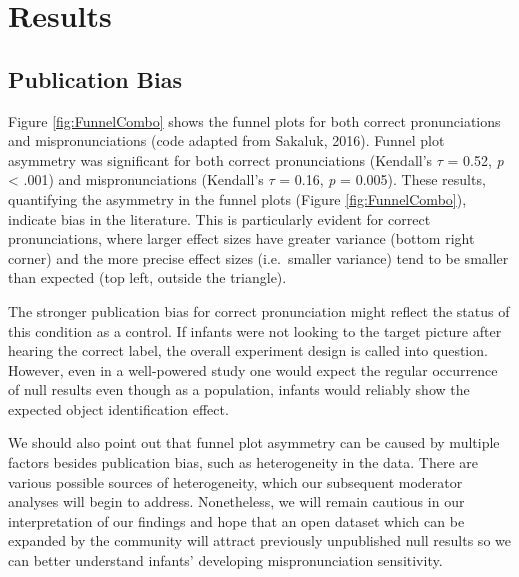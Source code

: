 \documentclass[
  man, noextraspace]{apa6}
\begin{document}
\hypertarget{results}{%
\section{Results}\label{results}}

\hypertarget{publication-bias-1}{%
\subsection{Publication Bias}\label{publication-bias-1}}

Figure \ref{fig:FunnelCombo} shows the funnel plots for both correct pronunciations and mispronunciations (code adapted from Sakaluk, 2016). Funnel plot asymmetry was significant for both correct pronunciations (Kendall's \(\tau\) = 0.52, \emph{p} \textless{} .001) and mispronunciations (Kendall's \(\tau\) = 0.16, \emph{p} = 0.005). These results, quantifying the asymmetry in the funnel plots (Figure \ref{fig:FunnelCombo}), indicate bias in the literature. This is particularly evident for correct pronunciations, where larger effect sizes have greater variance (bottom right corner) and the more precise effect sizes (i.e.~smaller variance) tend to be smaller than expected (top left, outside the triangle).

The stronger publication bias for correct pronunciation might reflect the status of this condition as a control. If infants were not looking to the target picture after hearing the correct label, the overall experiment design is called into question. However, even in a well-powered study one would expect the regular occurrence of null results even though as a population, infants would reliably show the expected object identification effect.

We should also point out that funnel plot asymmetry can be caused by multiple factors besides publication bias, such as heterogeneity in the data. There are various possible sources of heterogeneity, which our subsequent moderator analyses will begin to address. Nonetheless, we will remain cautious in our interpretation of our findings and hope that an open dataset which can be expanded by the community will attract previously unpublished null results so we can better understand infants' developing mispronunciation sensitivity.
\end{document}
